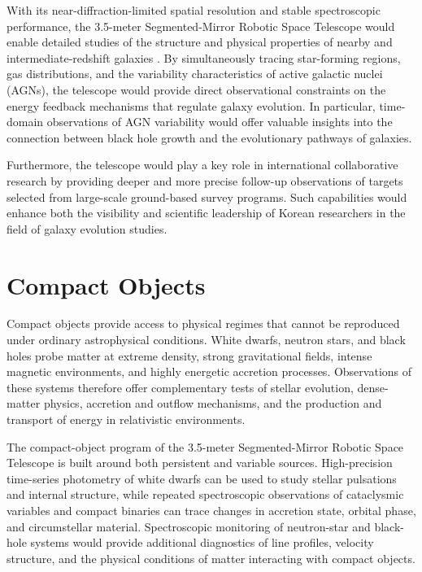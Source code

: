 With its near-diffraction-limited spatial resolution and stable spectroscopic performance, the 3.5-meter Segmented-Mirror Robotic Space Telescope would enable detailed studies of the structure and physical properties of nearby and intermediate-redshift galaxies \cite{springel2005}. By simultaneously tracing star-forming regions, gas distributions, and the variability characteristics of active galactic nuclei (AGNs), the telescope would provide direct observational constraints on the energy feedback mechanisms that regulate galaxy evolution. In particular, time-domain observations of AGN variability would offer valuable insights into the connection between black hole growth and the evolutionary pathways of galaxies.

Furthermore, the telescope would play a key role in international collaborative research by providing deeper and more precise follow-up observations of targets selected from large-scale ground-based survey programs. Such capabilities would enhance both the visibility and scientific leadership of Korean researchers in the field of galaxy evolution studies.

\section{Compact Objects}

Compact objects provide access to physical regimes that cannot be reproduced under ordinary astrophysical conditions. White dwarfs, neutron stars, and black holes probe matter at extreme density, strong gravitational fields, intense magnetic environments, and highly energetic accretion processes. Observations of these systems therefore offer complementary tests of stellar evolution, dense-matter physics, accretion and outflow mechanisms, and the production and transport of energy in relativistic environments.

The compact-object program of the 3.5-meter Segmented-Mirror Robotic Space Telescope is built around both persistent and variable sources. High-precision time-series photometry of white dwarfs can be used to study stellar pulsations and internal structure, while repeated spectroscopic observations of cataclysmic variables and compact binaries can trace changes in accretion state, orbital phase, and circumstellar material. Spectroscopic monitoring of neutron-star and black-hole systems would provide additional diagnostics of line profiles, velocity structure, and the physical conditions of matter interacting with compact objects.


